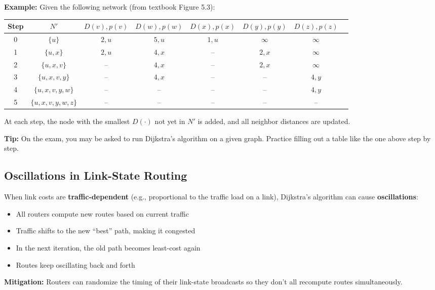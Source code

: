 \begin{exambox}
\textbf{Example:} Given the following network (from textbook Figure 5.3):

\begin{center}
\begin{tabular}{cccccccc}
\toprule
\textbf{Step} & $N'$ & $D(v),p(v)$ & $D(w),p(w)$ & $D(x),p(x)$ & $D(y),p(y)$ & $D(z),p(z)$ \\
\midrule
0 & $\{u\}$ & $2,u$ & $5,u$ & $1,u$ & $\infty$ & $\infty$ \\
1 & $\{u,x\}$ & $2,u$ & $4,x$ & -- & $2,x$ & $\infty$ \\
2 & $\{u,x,v\}$ & -- & $4,x$ & -- & $2,x$ & $\infty$ \\
3 & $\{u,x,v,y\}$ & -- & $4,x$ & -- & -- & $4,y$ \\
4 & $\{u,x,v,y,w\}$ & -- & -- & -- & -- & $4,y$ \\
5 & $\{u,x,v,y,w,z\}$ & -- & -- & -- & -- & -- \\
\bottomrule
\end{tabular}
\end{center}

At each step, the node with the smallest $D(\cdot)$ not yet in $N'$ is added, and all neighbor distances are updated.

\medskip
\textbf{Tip:} On the exam, you may be asked to run Dijkstra's algorithm on a given graph. Practice filling out a table like the one above step by step.
\end{exambox}

\begin{imagebox}
\end{imagebox}

\subsection{Oscillations in Link-State Routing}

\begin{warnbox}
When link costs are \textbf{traffic-dependent} (e.g., proportional to the traffic load on a link), Dijkstra's algorithm can cause \textbf{oscillations}:
\begin{itemize}[noitemsep]
    \item All routers compute new routes based on current traffic
    \item Traffic shifts to the new ``best'' path, making it congested
    \item In the next iteration, the old path becomes least-cost again
    \item Routes keep oscillating back and forth
\end{itemize}

\textbf{Mitigation:} Routers can randomize the timing of their link-state broadcasts so they don't all recompute routes simultaneously.
\end{warnbox}

